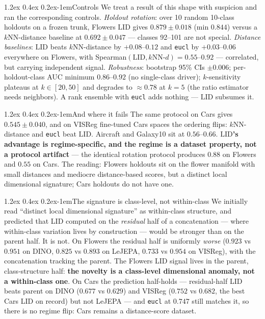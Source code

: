 \documentclass{article}
\makeatletter
\renewcommand\paragraph{\@startsection{paragraph}{4}{\z@}%
  {1.2ex \@plus 0.4ex \@minus 0.2ex}{-1em}{\normalsize\bf}}
\newcommand{\lid}{\mathrm{LID}}
\makeatother
\begin{document}
\paragraph{Controls}
We treat a result of this shape with suspicion and ran the corresponding
controls. \emph{Holdout rotation}: over 10 random 10-class holdouts on a frozen
trunk, Flowers $\lid$ gives $0.879\pm0.018$ (min $0.844$) versus a
$k$NN-distance baseline at $0.692\pm0.047$ --- classes 92--101 are not special.
\emph{Distance baselines}: $\lid$ beats $k$NN-distance by $+0.08$--$0.12$ and
\texttt{eucl} by $+0.03$--$0.06$ everywhere on Flowers, with
Spearman$(\lid,k\text{NN-}d)=0.55$--$0.92$ --- correlated, but carrying
independent signal. \emph{Robustness}: bootstrap 95\% CIs $\pm0.006$;
per-holdout-class AUC minimum $0.86$--$0.92$ (no single-class driver);
$k$-sensitivity plateaus at $k\in[20,50]$ and degrades to $\approx0.78$ at
$k=5$ (the ratio estimator needs neighbors). A rank ensemble with \texttt{eucl}
adds nothing --- $\lid$ subsumes it.

\paragraph{And where it fails}
The same protocol on Cars gives $0.545\pm0.040$, and on VISReg fine-tuned Cars
spaces the ordering flips: $k$NN-distance and \texttt{eucl} beat $\lid$.
Aircraft and Galaxy10 sit at $0.56$--$0.66$. \textbf{$\lid$'s advantage is
regime-specific, and the regime is a dataset property, not a protocol
artifact} --- the identical rotation protocol produces $0.88$ on Flowers and
$0.55$ on Cars. The reading: Flowers holdouts sit on the flower manifold with
small distances and mediocre distance-based scores, but a distinct local
dimensional signature; Cars holdouts do not have one.

\paragraph{The signature is class-level, not within-class}
We initially read ``distinct local dimensional signature'' as within-class
structure, and predicted that LID computed on the \emph{residual} half of a
concatenation --- where within-class variation lives by construction --- would
be stronger than on the parent half. It is not. On Flowers the residual half is
uniformly \emph{worse} ($0.923$ vs $0.951$ on DINO, $0.825$ vs $0.893$ on
LeJEPA, $0.733$ vs $0.954$ on VISReg), with the concatenation tracking the
parent. The Flowers LID signal lives in the parent, class-structure half:
\textbf{the novelty is a class-level dimensional anomaly, not a within-class
one}. On Cars the prediction half-holds --- residual-half LID beats parent on
DINO ($0.677$ vs $0.629$) and VISReg ($0.752$ vs $0.682$, the best Cars LID on
record) but not LeJEPA --- and \texttt{eucl} at $0.747$ still matches it, so
there is no regime flip: Cars remains a distance-score dataset.
\end{document}
